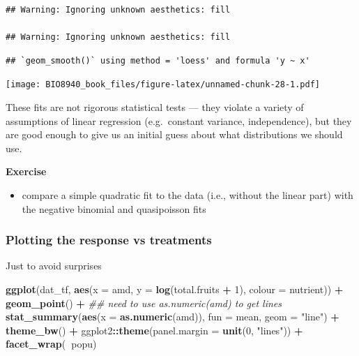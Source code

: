 \documentclass[
  12pt,
]{book}
\newenvironment{Shaded}{\begin{snugshade}}{\end{snugshade}}
\newcommand{\CommentTok}[1]{\textcolor[rgb]{0.56,0.35,0.01}{\textit{#1}}}
\newcommand{\DataTypeTok}[1]{\textcolor[rgb]{0.13,0.29,0.53}{#1}}
\newcommand{\DecValTok}[1]{\textcolor[rgb]{0.00,0.00,0.81}{#1}}
\newcommand{\KeywordTok}[1]{\textcolor[rgb]{0.13,0.29,0.53}{\textbf{#1}}}
\newcommand{\NormalTok}[1]{#1}
\newcommand{\OperatorTok}[1]{\textcolor[rgb]{0.81,0.36,0.00}{\textbf{#1}}}
\newcommand{\StringTok}[1]{\textcolor[rgb]{0.31,0.60,0.02}{#1}}
\providecommand{\tightlist}{%
  \setlength{\itemsep}{0pt}\setlength{\parskip}{0pt}}
\begin{document}
\begin{verbatim}
## Warning: Ignoring unknown aesthetics: fill

## Warning: Ignoring unknown aesthetics: fill
\end{verbatim}

\begin{verbatim}
## `geom_smooth()` using method = 'loess' and formula 'y ~ x'
\end{verbatim}

\texttt{[image: BIO8940\_book\_files/figure-latex/unnamed-chunk-28-1.pdf]}

These fits are not rigorous statistical tests --- they violate a variety of assumptions of linear regression (e.g.~constant variance, independence), but they are good enough to give us an initial guess about what distributions we should use.

\textbf{Exercise}

\begin{itemize}
\tightlist
\item
  compare a simple quadratic fit to the data (i.e., without the linear part) with the negative binomial and quasipoisson fits
\end{itemize}

\hypertarget{plotting-the-response-vs-treatments}{%
\subsubsection{Plotting the response vs treatments}\label{plotting-the-response-vs-treatments}}

Just to avoid surprises

\begin{Shaded}
\begin{Highlighting}[]
\KeywordTok{ggplot}\NormalTok{(dat_tf, }\KeywordTok{aes}\NormalTok{(}\DataTypeTok{x =}\NormalTok{ amd, }\DataTypeTok{y =} \KeywordTok{log}\NormalTok{(total.fruits }\OperatorTok{+}\StringTok{ }\DecValTok{1}\NormalTok{), }\DataTypeTok{colour =}\NormalTok{ nutrient)) }\OperatorTok{+}
\StringTok{  }\KeywordTok{geom_point}\NormalTok{() }\OperatorTok{+}
\StringTok{  }\CommentTok{## need to use as.numeric(amd) to get lines}
\StringTok{  }\KeywordTok{stat_summary}\NormalTok{(}\KeywordTok{aes}\NormalTok{(}\DataTypeTok{x =} \KeywordTok{as.numeric}\NormalTok{(amd)), }\DataTypeTok{fun =}\NormalTok{ mean, }\DataTypeTok{geom =} \StringTok{"line"}\NormalTok{) }\OperatorTok{+}
\StringTok{  }\KeywordTok{theme_bw}\NormalTok{() }\OperatorTok{+}
\StringTok{  }\NormalTok{ggplot2}\OperatorTok{::}\KeywordTok{theme}\NormalTok{(}\DataTypeTok{panel.margin =} \KeywordTok{unit}\NormalTok{(}\DecValTok{0}\NormalTok{, }\StringTok{"lines"}\NormalTok{)) }\OperatorTok{+}
\StringTok{  }\KeywordTok{facet_wrap}\NormalTok{(}\OperatorTok{~}\NormalTok{popu)}
\end{Highlighting}
\end{Shaded}
\end{document}
